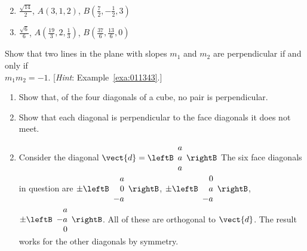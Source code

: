 \begin{multicols}{2}
\begin{ex}
\begin{enumerate}[label={\alph*.}]
\end{enumerate}
\begin{sol}
\begin{enumerate}[label={\alph*.}]
\setcounter{enumi}{1}
\item  $\frac{\sqrt{14}}{2}$, $A(3, 1, 2)$, $B(\frac{7}{2}, -\frac{1}{2}, 3)$

\setcounter{enumi}{3}
\item  $\frac{\sqrt{6}}{6}$, $A(\frac{19}{3}, 2, \frac{1}{3})$, $B(\frac{37}{6}, \frac{13}{6}, 0)$

\end{enumerate}
\end{sol}
\end{ex}

\begin{ex}
Show that two lines in the plane with slopes $m_{1}$ and $m_{2}$ are perpendicular if and only if \\ $m_{1}m_{2} = -1$. [\textit{Hint}: Example~\ref{exa:011343}.]
\end{ex}

\begin{ex}
\begin{enumerate}[label={\alph*.}]
\item Show that, of the four diagonals of a cube, no pair is perpendicular.

\item Show that each diagonal is perpendicular to the face diagonals it does not meet.

\end{enumerate}
\begin{sol}
\begin{enumerate}[label={\alph*.}]
\setcounter{enumi}{1}
\item  Consider the diagonal $\vect{d} = \leftB
\begin{array}{r}
	a\\
	a\\
	a
\end{array}
\rightB$ 
The six face diagonals in question are $\pm\leftB
\begin{array}{r}
a\\
0\\
-a
\end{array}
\rightB$, 
$\pm\leftB
\begin{array}{r}
0\\
a\\
-a
\end{array}
\rightB$, $
\pm\leftB
\begin{array}{r}
a\\
-a\\
0
\end{array}
\rightB$. All of these are orthogonal to $\vect{d}$. The result works for the other diagonals by symmetry.


\end{enumerate}
\end{sol}
\end{ex}
\end{multicols}

